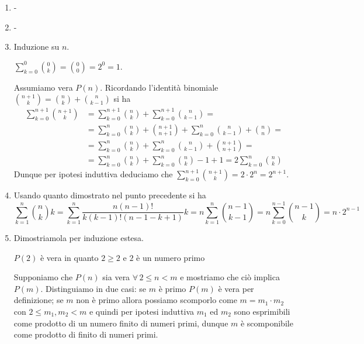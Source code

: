 \begin{enumerate}
\item -
\item -
\item Induzione su $ n $.
  \begin{pbase}
    $ \sum_{k = 0}^{0} \binom{0}{k} = \binom{0}{0} = 2^0 = 1 $.
  \end{pbase}
  \begin{pind}
    Assumiamo vera $ P(n) $. Ricordando l'identità binomiale $ \binom{n + 1}{k} = \binom{n}{k} + \binom{n}{k - 1} $ si ha
    \begin{align*}
      \sum_{k = 0}^{n + 1} \binom{n + 1}{k} & = \sum_{k = 0}^{n + 1} \binom{n}{k} + \sum_{k = 0}^{n + 1} \binom{n}{k - 1} = \\
                                            & = \sum_{k = 0}^{n} \binom{n}{k} + \binom{n + 1}{n + 1} + \sum_{k = 0}^{n} \binom{n}{k - 1} + \binom{n}{n} = \\
                                            & = \sum_{k = 0}^{n} \binom{n}{k} + \sum_{k = 0}^{n} \binom{n}{k - 1} + \binom{n + 1}{n + 1} = \\
                                            & = \sum_{k = 0}^{n} \binom{n}{k} + \sum_{k = 0}^{n} \binom{n}{k} - 1 + 1 = 2 \sum_{k = 0}^{n} \binom{n}{k}
    \end{align*}
    Dunque per ipotesi induttiva deduciamo che $ \sum_{k = 0}^{n + 1} \binom{n + 1}{k} = 2 \cdot 2^{n} = 2^{n + 1} $.
  \end{pind}
\item Usando quanto dimostrato nel punto precedente si ha
  \[\sum_{k = 1}^{n} \binom{n}{k} k = \sum_{k = 1}^{n} \frac{n (n - 1)!}{k (k - 1)! (n - 1 - k + 1)} k = n \sum_{k = 1}^{n} \binom{n - 1}{k - 1} = n \sum_{k = 0}^{n - 1} \binom{n - 1}{k} = n \cdot 2^{n - 1}\]
\item Dimostriamola per induzione estesa.
  \begin{pbase}
    $ P(2) $ è vera in quanto $ 2 \geq 2 $ e $ 2 $ è un numero primo
  \end{pbase}
  \begin{pind}
    Supponiamo che $ P(n) $ sia vera $ \forall \, 2 \leq n < m $ e mostriamo che ciò implica $ P(m) $. Distinguiamo in due casi: se $ m $ è primo $ P(m) $ è vera per definizione; se $ m $ non è primo allora possiamo scomporlo come $ m = m_1 \cdot m_2 $ con $ 2 \leq m_1, m_2 < m $ e quindi per ipotesi induttiva $ m_1 $ ed $ m_2 $ sono esprimibili come prodotto di un numero finito di numeri primi, dunque $ m $ è scomponibile come prodotto di finito di numeri primi.

\end{pind}
\end{enumerate}

